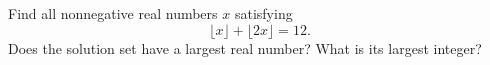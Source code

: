 Find all nonnegative real numbers $x$ satisfying
\[
\lfloor x\rfloor+\lfloor2x\rfloor=12.
\]
Does the solution set have a largest real number? What is its largest integer?

